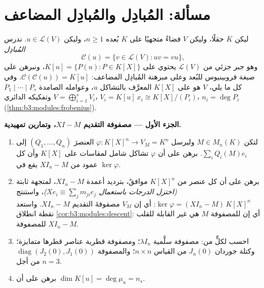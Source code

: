 \section{مسألة: المُبادِل والمُبادِل المضاعف}

\begin{problem}\label{pb:b3:modules:1}
ليكن $K$ حقلًا، وليكن $V$ فضاءً متجهيًا على $K$ بُعده $n \geq
1$،
وليكن $u \in \mathcal L(V)$. ندرس \emph{المُبادِل}
\[
\mathcal C(u) = \{v \in \mathcal L(V) : uv = vu\},
\]
وهو جبر جزئي من $\mathcal L(V)$ يحتوي على $K[u] = \{P(u) : P \in
K[X]\}$، ونبرهن على
صيغة فروبينيوس للبُعد وعلى مبرهنة المُبادِل المضاعف: $\mathcal C(\mathcal C(u)) = K[u]$. وفي
كل ما يلي، $V$ هو  على $K[X]$ المعرَّف بالتشاكل $u$، وعوامله
الصامدة $P_1 \mid \cdots \mid P_s$ وتفكيكه الدائري $V =
\bigoplus_{i=1}^s V_i$، $V_i = K[u]\,x_i \cong K[X]/(P_i)$، $n_i
= \deg P_i$
(\cref{thm:b3:modules:frobenius}).

\medskip
\noindent\textbf{الجزء الأول --- مصفوفة التقديم $XI - M$،
وتمارين تمهيدية.}
\begin{enumerate}
  \item لتكن $M \in M_n(K)$ وليرسل $\varphi \colon K[X]^n \to V_M
        = K^n$ العنصرَ $(Q_1, \dots, Q_n)$ إلى
        $\sum_i Q_i(M)e_i$. برهن على أن $\varphi$ تشاكل شامل لمقاسات على
        $K[X]$ وأن كل عمود من $XI_n - M$ يقع في $\ker\varphi$.
  \item برهن على أن كل عنصر من $K[X]^n$ موافقٌ، بترديد أعمدة
        $XI_n - M$، لمتجهة ثابتة \emph{(اختزل الدرجات باستعمال
        $Xe_i \equiv \sum_j m_{ji}e_j$)}، واستنتج $\ker\varphi = (XI_n - M)\,K[X]^n$: أي إن  $V_M$ مصفوفةَ
        التقديم $XI_n - M$. واستعد نقطة انطلاق \cref{cor:b3:modules:descent}: أي
        إن  للمصفوفة $M$ هي  غير
        القابلة للقلب للمصفوفة $XI_n - M$.
  \item احسب  لكلٍّ من: مصفوفة سلَّمية $\lambda I_n$؛
        ومصفوفة قطرية عناصر قطرها متمايزة؛ وكتلة جوردان
        $J_n(0)$ من القياس $n \times n$؛ والمصفوفة $\operatorname{diag}(J_2(0), J_1(0))$ من
        أجل $n = 3$.
  \item برهن على أن $\dim K[u] = \deg \mu_u = n_s$.
\end{enumerate}


\end{problem}
